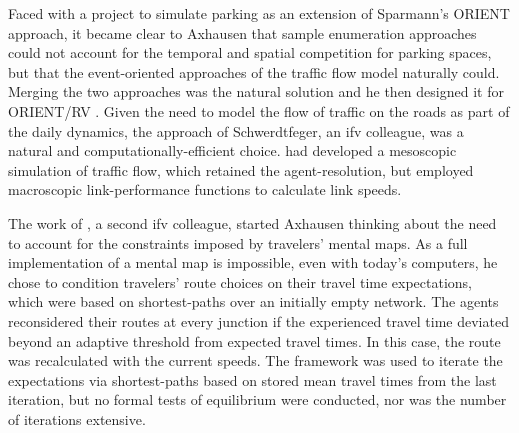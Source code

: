 Faced with a project to simulate parking as an extension of Sparmann's ORIENT approach, it became clear to Axhausen that sample enumeration approaches could not account for the temporal and spatial competition for parking spaces, but that the event-oriented approaches of the traffic flow model naturally could. 
Merging the two approaches was the natural solution and he then designed it for ORIENT/RV \citep[][]{Axhausen_TechRep_IFV_1989}. 
Given the need to model the flow of traffic on the roads as part of the daily dynamics, the approach of Schwerdtfeger, an \gls{ifv} colleague, was a natural and computationally-efficient choice. 
\citet[][]{Schwerdtfeger_VolmulerHamerslag_1984} had developed a mesoscopic simulation of traffic flow, which retained the agent-resolution, but employed macroscopic link-performance functions to calculate link speeds. 

The work of \citet[][]{Swiderski_CarpenterJones_1983}, a second \gls{ifv} colleague, started Axhausen thinking about the need to account for the constraints imposed by travelers' mental maps. As a full implementation of a mental map is impossible, even with today's computers, he chose to condition travelers' route choices on their travel time expectations, which were based on shortest-paths over an initially empty network. The agents reconsidered their routes at every junction if the experienced travel time deviated beyond an adaptive threshold from expected travel times. 
In this case, the route was recalculated with the current speeds. 
%
The framework was used to iterate \citep[][]{Axhausen_Jones_1990} the expectations via shortest-paths based on stored mean travel times from the last iteration, but no formal tests of equilibrium were conducted, nor was the number of iterations extensive. 

